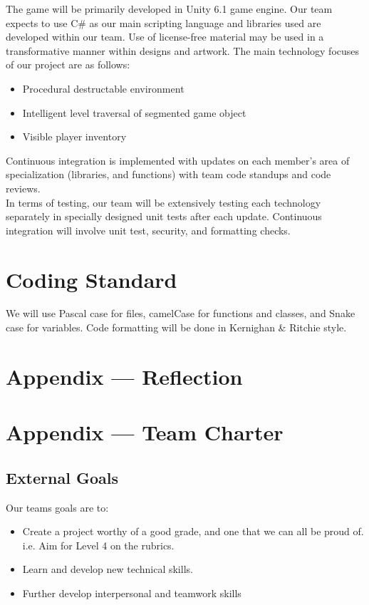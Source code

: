 \documentclass{article}
\begin{document}
The game will be primarily developed in Unity 6.1 game engine. Our team expects to use C\# as our main scripting language and libraries used are developed within our team. Use of license-free material may be used in a transformative manner within designs and artwork. The main technology focuses of our project are as follows:
\begin{itemize}
\item{Procedural destructable environment}
\item{Intelligent level traversal of segmented game object}
\item{Visible player inventory}
\end{itemize}

Continuous integration is implemented with updates on each member’s area of specialization (libraries, and functions) with team code standups and code reviews.\\

In terms of testing, our team will be extensively testing each technology separately in specially designed unit tests after each update. Continuous integration will involve unit test, security, and formatting checks.\\


\section{Coding Standard}

We will use Pascal case for files, camelCase for functions and classes, and Snake case for variables. Code formatting will be done in Kernighan \& Ritchie style.

\newpage{}

\section*{Appendix --- Reflection}



\newpage{}

\section*{Appendix --- Team Charter}

\subsection*{External Goals}

Our teams goals are to:
\begin{itemize}
\item{Create a project worthy of a good grade, and one that we can all be proud of. i.e. Aim for Level 4 on the rubrics.}
\item{Learn and develop new technical skills.}
\item{Further develop interpersonal and teamwork skills}
\end{itemize}
\end{document}
